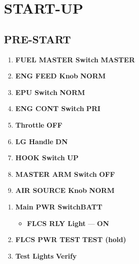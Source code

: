 \marginfigeometry

\section{START-UP}

\subsection{PRE-START}
\begin{checklistenumerate}
    \cbstart
    \begin{enumerate}
        \item \textbf{FUEL MASTER Switch} \dotfill \textbf{MASTER}
        \item \textbf{ENG FEED Knob} \dotfill \textbf{NORM}
        \item \textbf{EPU Switch} \dotfill \textbf{NORM}
        \item \textbf{ENG CONT Switch} \dotfill \textbf{PRI}
        \item \textbf{Throttle} \dotfill \textbf{OFF}
        \item \textbf{LG Handle} \dotfill \textbf{DN}
        \item \textbf{HOOK Switch} \dotfill \textbf{UP}
        \item \textbf{MASTER ARM Switch} \dotfill \textbf{OFF}
        \item \textbf{AIR SOURCE Knob} \dotfill \textbf{NORM}
    \end{enumerate}
    \cbend
    \begin{enumerate}
        \item \textbf{Main PWR Switch}\cbstart \dotfill \textbf{BATT}\cbend
        \begin{itemize}
            \item \textbf{FLCS RLY Light} --- \textbf{ON}
        \end{itemize}
        \item \textbf{FLCS PWR TEST} \dotfill \textbf{TEST (hold)}
        \item \textbf{Test Lights} \dotfill \textbf{Verify}

\end{enumerate}
\end{checklistenumerate}
